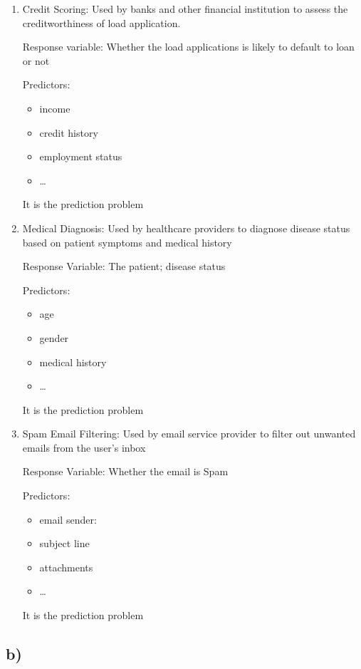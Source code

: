 \documentclass[
]{article}
\begin{document}
\begin{enumerate}
\def\labelenumi{\arabic{enumi}.}
\item
  Credit Scoring: Used by banks and other financial institution to
  assess the creditworthiness of load application.

  Response variable: Whether the load applications is likely to default
  to loan or not

  Predictors:

  \begin{itemize}
  \item
    income
  \item
    credit history
  \item
    employment status
  \item
    \ldots{}
  \end{itemize}

  It is the prediction problem
\item
  Medical Diagnosis: Used by healthcare providers to diagnose disease
  status based on patient symptoms and medical history

  Response Variable: The patient; disease status

  Predictors:

  \begin{itemize}
  \item
    age
  \item
    gender
  \item
    medical history
  \item
    \ldots{}
  \end{itemize}

  It is the prediction problem
\item
  Spam Email Filtering: Used by email service provider to filter out
  unwanted emails from the user's inbox

  Response Variable: Whether the email is Spam

  Predictors:

  \begin{itemize}
  \item
    email sender:
  \item
    subject line
  \item
    attachments
  \item
    \ldots{}
  \end{itemize}

  It is the prediction problem
\end{enumerate}

\hypertarget{b-3}{%
\subsection{b)}\label{b-3}}
\end{document}
